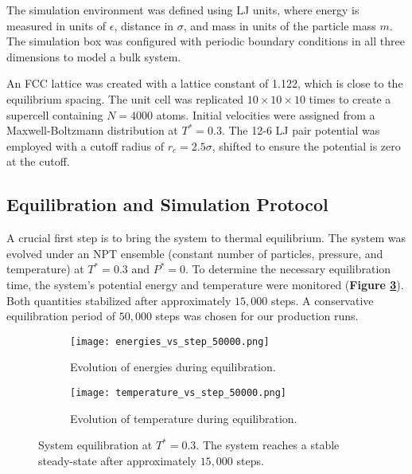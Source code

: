 \documentclass{article}
\begin{document}
The simulation environment was defined using LJ units, where energy is measured in units of $\epsilon$, distance in $\sigma$, and mass in units of the particle mass $m$. The simulation box was configured with periodic boundary conditions in all three dimensions to model a bulk system.

An FCC lattice was created with a lattice constant of 1.122, which is close to the equilibrium spacing. The unit cell was replicated $10 \times 10 \times 10$ times to create a supercell containing $N=4000$ atoms. Initial velocities were assigned from a Maxwell-Boltzmann distribution at $T^* = 0.3$. The 12-6 LJ pair potential was employed with a cutoff radius of $r_c = 2.5\sigma$, shifted to ensure the potential is zero at the cutoff.

\subsection{Equilibration and Simulation Protocol}

A crucial first step is to bring the system to thermal equilibrium. The system was evolved under an NPT ensemble (constant number of particles, pressure, and temperature) at $T^*=0.3$ and $P^*=0$. To determine the necessary equilibration time, the system's potential energy and temperature were monitored (\textbf{Figure \ref{fig:equilibration}}). Both quantities stabilized after approximately $15,000$ steps. A conservative equilibration period of $50,000$ steps was chosen for our production runs.

\begin{figure}[htbp]
    \centering
    \begin{subfigure}[b]{0.49\textwidth}
        \centering
        \texttt{[image: energies\_vs\_step\_50000.png]}
        \caption{Evolution of energies during equilibration.}
        \label{fig:equil_energy}
    \end{subfigure}
    \hfill
    \begin{subfigure}[b]{0.49\textwidth}
        \centering
        \texttt{[image: temperature\_vs\_step\_50000.png]}
        \caption{Evolution of temperature during equilibration.}
        \label{fig:equil_temp}
    \end{subfigure}
    \caption{System equilibration at $T^*=0.3$. The system reaches a stable steady-state after approximately $15,000$ steps.}
    \label{fig:equilibration}
\end{figure}
\end{document}
